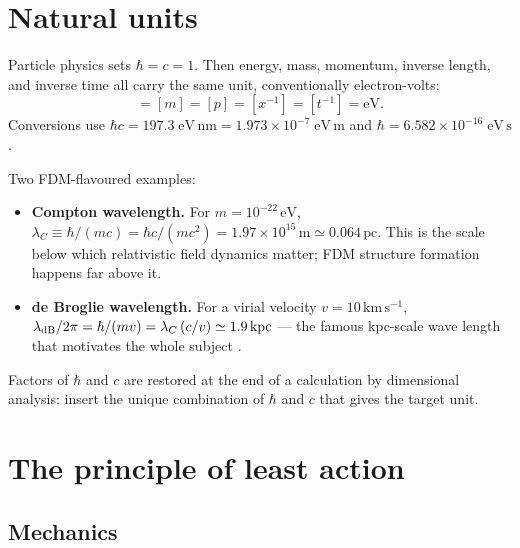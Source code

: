 \documentclass[12pt]{article}
\newcommand{\eV}{\,\mathrm{eV}}
\newcommand{\kpc}{\,\mathrm{kpc}}
\newcommand{\kms}{\,\mathrm{km\,s^{-1}}}
\begin{document}
\section{Natural units}
\label{sec:units}

Particle physics sets $\hbar = c = 1$.  Then energy, mass, momentum,
inverse length, and inverse time all carry the same unit,
conventionally electron-volts:
%
\begin{equation}
  [E] = [m] = [p] = [x^{-1}] = [t^{-1}] = \mathrm{eV}.
\end{equation}
%
Conversions use $\hbar c = 197.3\;\mathrm{eV\,nm} =
1.973\times10^{-7}\;\mathrm{eV\,m}$ and $\hbar =
6.582\times10^{-16}\;\mathrm{eV\,s}$.

Two FDM-flavoured examples:
%
\begin{itemize}
  \item \textbf{Compton wavelength.}  For $m = 10^{-22}\eV$,
        $\lambda_C \equiv \hbar/(mc) = \hbar c/(mc^2)
        = 1.97\times10^{15}\,\mathrm{m} \simeq 0.064\,\mathrm{pc}$.
        This is the scale below which relativistic field dynamics
        matter; FDM structure formation happens far above it.
  \item \textbf{de Broglie wavelength.}  For a virial velocity
        $v = 10\kms$,
        $\lambda_{\rm dB}/2\pi = \hbar/(mv) = \lambda_C\,(c/v)
        \simeq 1.9\kpc$ --- the famous kpc-scale wave length that
        motivates the whole subject \citep{Hui2017}.
\end{itemize}
%
Factors of $\hbar$ and $c$ are restored at the end of a calculation by
dimensional analysis: insert the unique combination of $\hbar$ and $c$
that gives the target unit.

\section{The principle of least action}
\label{sec:action}

\subsection{Mechanics}
\label{sec:action_mech}
\end{document}
